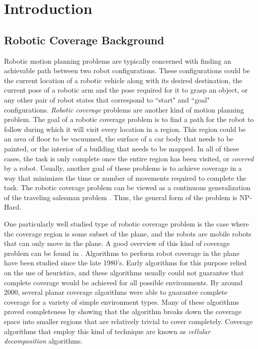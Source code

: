 \chapter{Introduction}

\section{Robotic Coverage Background}

Robotic motion planning problems are typically concerned with finding an achievable path between two robot configurations. These configurations could be the current location of a robotic vehicle along with its desired destination, the current pose of a robotic arm and the pose required for it to grasp an object, or any other pair of robot states that correspond to ``start" and ``goal" configurations. \textit{Robotic coverage} problems are another kind of motion planning problem. The goal of a robotic coverage problem is to find a path for the robot to follow during which it will visit every location in a region. This region could be an area of floor to be vacuumed, the surface of a car body that needs to be painted, or the interior of a building that needs to be mapped. In all of these cases, the task is only complete once the entire region has been visited, or \textit{covered} by a robot. Usually, another goal of these problems is to achieve coverage in a way that minimizes the time or number of movements required to complete the task. The robotic coverage problem can be viewed as a continuous generalization of the traveling salesman problem \cite{Arkin1993}. Thus, the general form of the problem is NP-Hard. 

One particularly well studied type of robotic coverage problem is the case where the coverage region is some subset of the plane, and the robots are mobile robots that can only move in the plane. A good overview of this kind of coverage problem can be found in \cite{Choset}. Algorithms to perform robot coverage in the plane have been studied since the late 1980's. Early algorithms for this purpose relied on the use of heuristics, and these algorithms usually could not guarantee that complete coverage would be achieved for all possible environments. By around 2000, several planar coverage algorithms were able to guarantee complete coverage for a variety of simple environment types. Many of these algorithms proved completeness by showing that the algorithm breaks down the coverage space into smaller regions that are relatively trivial to cover completely. Coverage algorithms that employ this kind of technique are known as \textit{cellular decomposition} algorithms.

